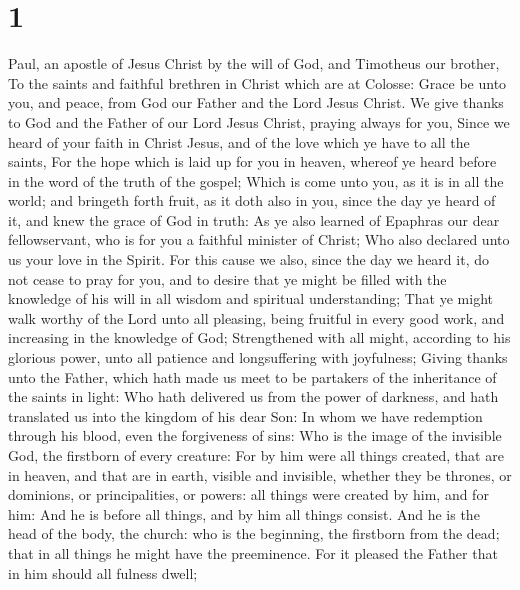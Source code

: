 \hypertarget{section}{%
\section{1}\label{section}}

 Paul, an apostle of Jesus Christ by the will of God, and
Timotheus our brother,  To the saints and faithful brethren
in Christ which are at Colosse: Grace be unto you, and peace, from God
our Father and the Lord Jesus Christ.  We give thanks to God
and the Father of our Lord Jesus Christ, praying always for you,
 Since we heard of your faith in Christ Jesus, and of the
love which ye have to all the saints,  For the hope which is
laid up for you in heaven, whereof ye heard before in the word of the
truth of the gospel;  Which is come unto you, as it is in
all the world; and bringeth forth fruit, as it doth also in you, since
the day ye heard of it, and knew the grace of God in truth: 
As ye also learned of Epaphras our dear fellowservant, who is for you a
faithful minister of Christ;  Who also declared unto us your
love in the Spirit.  For this cause we also, since the day
we heard it, do not cease to pray for you, and to desire that ye might
be filled with the knowledge of his will in all wisdom and spiritual
understanding;  That ye might walk worthy of the Lord unto
all pleasing, being fruitful in every good work, and increasing in the
knowledge of God;  Strengthened with all might, according
to his glorious power, unto all patience and longsuffering with
joyfulness;  Giving thanks unto the Father, which hath made
us meet to be partakers of the inheritance of the saints in light:
 Who hath delivered us from the power of darkness, and hath
translated us into the kingdom of his dear Son:  In whom we
have redemption through his blood, even the forgiveness of sins:
 Who is the image of the invisible God, the firstborn of
every creature:  For by him were all things created, that
are in heaven, and that are in earth, visible and invisible, whether
they be thrones, or dominions, or principalities, or powers: all things
were created by him, and for him:  And he is before all
things, and by him all things consist.  And he is the head
of the body, the church: who is the beginning, the firstborn from the
dead; that in all things he might have the preeminence. 
For it pleased the Father that in him should all fulness dwell;

